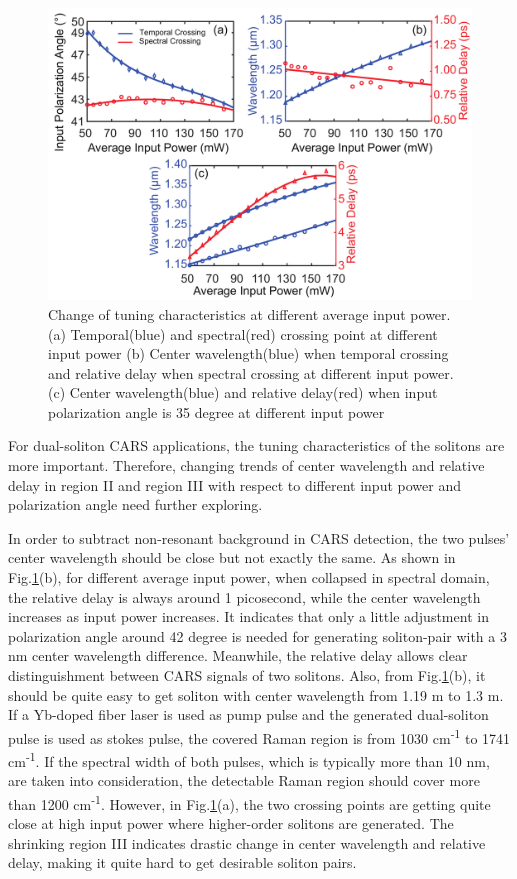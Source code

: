 \documentclass{osa-article}
\begin{document}
\begin{figure}[htbp]
\centering%
\includegraphics[width=320pt]{fig_tuning.pdf}
\caption{Change of tuning characteristics at different average input power. (a) Temporal(blue) and spectral(red) crossing point at different input power (b) Center wavelength(blue) when temporal crossing and relative delay when spectral crossing at different input power. (c) Center wavelength(blue) and relative delay(red) when input polarization angle is 35 degree at different input power }
\label{fig_tuning}\vspace*{-6pt}
\end{figure}

For dual-soliton CARS applications\cite{chen_dual-soliton_2016,chen_quantitative_2016}, the tuning characteristics of the solitons are more important. Therefore, changing trends of center wavelength and relative delay in region II and region III with respect to different input power and polarization angle need further exploring.  

In order to subtract non-resonant background in CARS detection, the two pulses' center wavelength should be close but not exactly the same\cite{rocha-mendoza_differential_2009}. As shown in Fig.\ref{fig_tuning}(b), for different average input power, when collapsed in spectral domain, the relative delay is always around 1 picosecond, while the center wavelength increases as input power increases. It indicates that only a little adjustment in polarization angle around 42 degree is needed for generating soliton-pair with a 3 nm center wavelength difference. Meanwhile, the relative delay allows clear distinguishment between CARS signals of two solitons. Also, from Fig.\ref{fig_tuning}(b), it should be quite easy to get soliton with center wavelength from 1.19 \textmu m to 1.3 \textmu m. If a Yb-doped fiber laser is used as pump pulse and the generated dual-soliton pulse is used as stokes pulse, the covered Raman region is from 1030 cm\textsuperscript{-1} to 1741 cm\textsuperscript{-1}. If the spectral width of both pulses, which is typically more than 10 nm, are taken into consideration, the detectable Raman region should cover more than 1200 cm\textsuperscript{-1}. However, in Fig.\ref{fig_tuning}(a), the two crossing points are getting quite close at high input power where higher-order solitons are generated. The shrinking region III indicates drastic change in center wavelength and relative delay, making it quite hard to get desirable soliton pairs.
\end{document}
